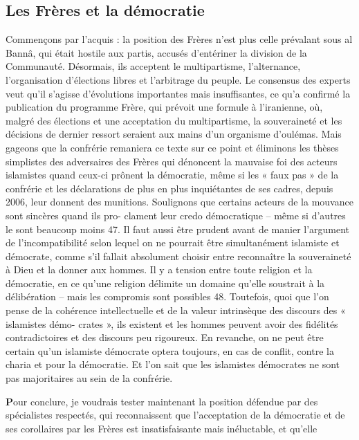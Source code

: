 \hypertarget{les-fruxe8res-et-la-duxe9mocratie}{%
\subsection{Les Frères et la
démocratie}\label{les-fruxe8res-et-la-duxe9mocratie}}

Commençons par l'acquis : la position des Frères n'est plus celle
prévalant sous al Bannâ, qui était hostile aux partis, accusés
d'entériner la division de la Communauté. Désormais, ils acceptent le
multipartisme, l'alternance, l'organisation d'élections libres et
l'arbitrage du peuple. Le consensus des experts veut qu'il s'agisse
d'évolutions importantes mais insuffisantes, ce qu'a confirmé la
publication du programme Frère, qui prévoit une formule à l'iranienne,
où, malgré des élections et une acceptation du multipartisme, la
souveraineté et les décisions de dernier ressort seraient aux mains d'un
organisme d'oulémas. Mais gageons que la confrérie remaniera ce texte
sur ce point et éliminons les thèses simplistes des adversaires des
Frères qui dénoncent la mauvaise foi des acteurs islamistes quand
ceux-ci prônent la démocratie, même si les « faux pas » de la confrérie
et les déclarations de plus en plus inquiétantes de ses cadres, depuis
2006, leur donnent des munitions. Soulignons que certains acteurs de la
mouvance sont sincères quand ils pro- clament leur credo démocratique --
même si d'autres le sont beaucoup moins 47. Il faut aussi être prudent
avant de manier l'argument de l'incompatibilité selon lequel on ne
pourrait être simultanément islamiste et démocrate, comme s'il fallait
absolument choisir entre reconnaître la souveraineté à Dieu et la donner
aux hommes. Il y a tension entre toute religion et la démocratie, en ce
qu'une religion délimite un domaine qu'elle soustrait à la délibération
-- mais les compromis sont possibles 48. Toutefois, quoi que l'on pense
de la cohérence intellectuelle et de la valeur intrinsèque des discours
des « islamistes démo- crates », ils existent et les hommes peuvent
avoir des fidélités contradictoires et des discours peu rigoureux. En
revanche, on ne peut être certain qu'un islamiste démocrate optera
toujours, en cas de conflit, contre la charia et pour la démocratie. Et
l'on sait que les islamistes démocrates ne sont pas majoritaires
au sein de la confrérie.

\textbf{P}our conclure, je voudrais tester maintenant la position
défendue par des spécialistes respectés, qui reconnaissent que
l'acceptation de la démocratie et de ses corollaires par les Frères est
insatisfaisante mais inéluctable, et qu'elle


